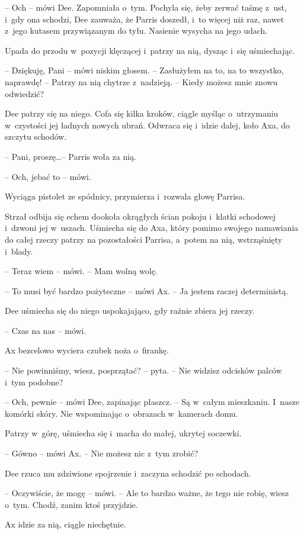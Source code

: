 \documentclass[oneside,polish,11pt,sfheadings]{mwbk}
\begin{document}
-- Och -- mówi Dee. Zapomniała o~tym. Pochyla się, żeby zerwać taśmę z~ust, i~gdy ona schodzi, Dee zauważa, że Parris doszedł, i~to więcej niż
raz, nawet z~jego kutasem przywiązanym do tyłu. Nasienie wysycha na jego
udach.

Upada do przodu w~pozycji klęczącej i~patrzy na nią, dysząc i~się
uśmiechając.

-- Dziękuję, Pani -- mówi niskim głosem. -- Zasłużyłem na to, na to
wszystko, naprawdę! -- Patrzy na nią chytrze z~nadzieją. -- Kiedy możesz
mnie znowu odwiedzić?

Dee patrzy się na niego. Cofa się kilka kroków, ciągle myśląc o~utrzymaniu w~czystości jej ładnych nowych ubrań. Odwraca się i~idzie
dalej, koło Axa, do szczytu schodów.

-- Pani, proszę\ldots -- Parris woła za nią.

-- Och, jebać to -- mówi.

Wyciąga pistolet ze spódnicy, przymierza i~rozwala głowę Parrisa.

Strzał odbija się echem dookoła okrągłych ścian pokoju i~klatki
schodowej i~dzwoni jej w~uszach. Uśmiecha się do Axa, który pomimo
swojego namawiania do całej rzeczy patrzy na pozostałości Parrisa, a~potem na nią, wstrząśnięty i~blady.

-- Teraz wiem -- mówi. -- Mam wolną wolę.

-- To musi być bardzo pożyteczne -- mówi Ax. -- Ja jestem raczej
deterministą.

Dee uśmiecha się do niego uspokajająco, gdy raźnie zbiera jej rzeczy.

-- Czas na nas -- mówi.

Ax bezcelowo wyciera czubek noża o~firankę.

-- Nie powinniśmy, wiesz, posprzątać? -- pyta. -- Nie widzisz odcisków
palców i~tym podobne?

-- Och, pewnie -- mówi Dee, zapinając płaszcz. -- Są w~całym mieszkaniu. I~nasze komórki skóry. Nie wspominając o~obrazach w~kamerach domu.

Patrzy w~górę, uśmiecha się i~macha do małej, ukrytej soczewki.

-- Gówno -- mówi Ax. -- Nie możesz nic z~tym zrobić?

Dee rzuca mu zdziwione spojrzenie i~zaczyna schodzić po schodach.

-- Oczywiście, że mogę -- mówi. -- Ale to bardzo ważne, że tego nie robię,
wiesz o~tym. Chodź, zanim ktoś przyjdzie.

Ax idzie za nią, ciągle niechętnie.
\end{document}

